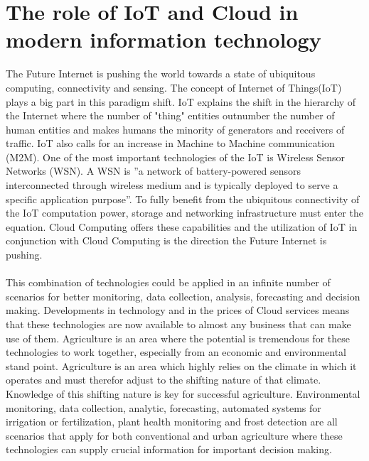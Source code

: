 \documentclass[]{uiophd}
\begin{document}
\section{The role of IoT and Cloud in modern information technology}
The Future Internet is pushing the world towards a state of ubiquitous computing, connectivity and sensing. The concept of Internet of Things(IoT) plays a big part in this paradigm shift. IoT explains the shift in the hierarchy of the Internet where the number of "thing" entities outnumber the number of human entities and makes humans the minority of generators and receivers of traffic. IoT also calls for an increase in Machine to Machine communication (M2M). One of the most important technologies of the IoT is Wireless Sensor Networks (WSN). A WSN is ''a network of battery-powered sensors interconnected through wireless medium and is typically deployed to serve a specific application purpose''\cite{Ojha2015662}. To fully benefit from the ubiquitous connectivity of the IoT computation power, storage and networking infrastructure must enter the equation. Cloud Computing offers these capabilities and the utilization of IoT in conjunction with Cloud Computing is the direction the Future Internet is pushing. 
\\\\
This combination of technologies could be applied in an infinite number of scenarios for better monitoring, data collection, analysis, forecasting and decision making. Developments in technology and in the prices of Cloud services means that these technologies are now available to almost any business that can make use of them. Agriculture is an area where the potential is tremendous for these technologies to work together, especially from an economic and environmental stand point. Agriculture is an area which highly relies on the climate in which it operates and must therefor adjust to the shifting nature of that climate. Knowledge of this shifting nature is key for successful agriculture. Environmental monitoring, data collection, analytic, forecasting, automated systems for irrigation or fertilization, plant health monitoring and frost detection are all scenarios that apply for both conventional and urban agriculture where these technologies can supply crucial information for important decision making.
\end{document}
